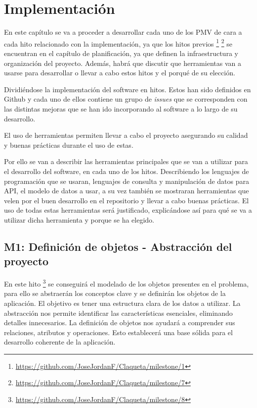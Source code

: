 \chapter{Implementación}

En este capítulo se va a proceder a desarrollar cada uno de los PMV de cara a cada hito relacionado con 
la implementación, ya que los hitos previos \footnote{\url{https://github.com/JoseJordanF/Claqueta/milestone/1}} \footnote{\url{https://github.com/JoseJordanF/Claqueta/milestone/7}} se encuentran en el capítulo de 
planificación, ya que definen la infraestructura y organización del proyecto. Además, habrá que 
discutir que herramientas van a usarse para desarrollar o llevar a cabo estos hitos y el porqué de su 
elección. 

Dividiéndose la implementación del software en hitos. Estos han sido definidos en Github
y cada uno de ellos contiene un grupo de \textit{issues} que se corresponden con las distintas
mejoras que se han ido incorporando al software a lo largo de su desarrollo.

El uso de herramientas permiten llevar a cabo el proyecto asegurando su calidad y buenas prácticas 
durante el uso de estas.

Por ello se van a describir las herramientas principales que se van a utilizar para el desarrollo del 
software, en cada uno de los hitos. Describiendo los lenguajes de programación que se usaran, lenguajes 
de consulta y manipulación de datos para API, el modelo de datos a usar, a su vez también se mostraran 
herramientas que velen por el buen desarrollo en el repositorio y llevar a cabo buenas prácticas. El 
uso de todas estas herramientas será justificado, explicándose así para qué se va a utilizar dicha 
herramienta y porque se ha elegido.

\section{M1: Definición de objetos - Abstracción del proyecto}

En este hito \footnote{\url{https://github.com/JoseJordanF/Claqueta/milestone/8}} se conseguirá el modelado de los objetos presentes en el problema, para ello se abstraerán 
los conceptos clave y se definirán los objetos de la aplicación. El objetivo es tener una estructura 
clara de los datos a utilizar. La abstracción nos permite identificar las características esenciales, 
eliminando detalles innecesarios. La definición de objetos nos ayudará a comprender sus relaciones, 
atributos y operaciones. Esto establecerá una base sólida para el desarrollo coherente de la aplicación.

